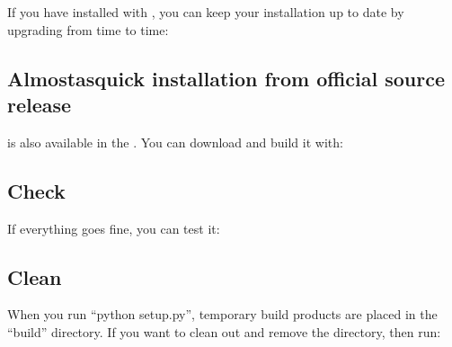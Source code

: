 \documentclass[letterpaper,10pt,english]{sphinxmanual}
\begin{document}
\begin{sphinxVerbatim}[commandchars=\\\{\}]
   
\end{sphinxVerbatim}

If you have installed with , you can keep your installation up to date
by upgrading from time to time:

\begin{sphinxVerbatim}[commandchars=\\\{\}]
    
\end{sphinxVerbatim}


\subsection{Almost\sphinxhyphen{}as\sphinxhyphen{}quick installation from official source release}
\label{\detokenize{install:almost-as-quick-installation-from-official-source-release}}
 is also available in the
. You can
download and build it with:

\begin{sphinxVerbatim}[commandchars=\\\{\}]
   
\end{sphinxVerbatim}


\subsection{Check}
\label{\detokenize{install:check}}
If everything goes fine, you can test it:

\begin{sphinxVerbatim}[commandchars=\\\{\}]
  
 
\end{sphinxVerbatim}


\subsection{Clean}
\label{\detokenize{install:clean}}
When you run “python setup.py”, temporary build products are placed in the
“build” directory. If you want to clean out and remove the  directory,
then run:
\end{document}
